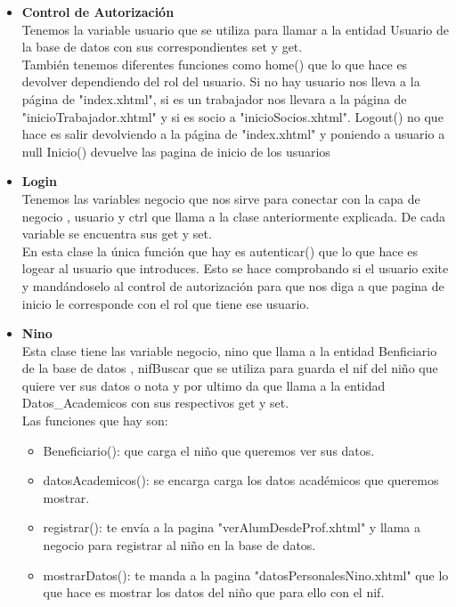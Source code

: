 \documentclass{article}
\begin{document}
\begin{itemize}
\item \textbf{Control de Autorización}\\
Tenemos la variable usuario que se utiliza para llamar a la entidad Usuario de la base de datos con sus correspondientes set y get.\\
También tenemos diferentes funciones como home() que lo que hace es devolver dependiendo del rol del usuario. Si no hay usuario nos lleva a la página de "index.xhtml", si es un trabajador nos llevara a la página de "inicioTrabajador.xhtml" y si es socio a "inicioSocios.xhtml". Logout() no que hace es salir devolviendo a la página de "index.xhtml" y poniendo a usuario a null Inicio() devuelve las pagina de inicio de los usuarios
 
\item \textbf{Login}\\
Tenemos las variables negocio que nos sirve para conectar con la capa de negocio , usuario y ctrl que llama a la clase anteriormente explicada. De cada variable se encuentra sus get y set.\\
En esta clase la única función que hay es autenticar() que lo que hace es logear al usuario que introduces. Esto se hace comprobando si el usuario exite y mandándoselo al control de autorización para que nos diga a que pagina de inicio le corresponde con el rol que tiene ese usuario.
 
\item \textbf{Nino}\\
Esta clase tiene las variable negocio, nino que llama a la entidad Benficiario de la base de datos , nifBuscar que se utiliza para guarda el nif del niño que quiere ver sus datos o nota y por ultimo da que llama a la entidad Datos_Academicos con sus respectivos get y set.\\ 
Las funciones que hay son:
\begin{itemize}
\item Beneficiario(): que carga el niño que queremos ver sus datos.
\item datosAcademicos(): se encarga carga los datos académicos que queremos mostrar.
\item registrar(): te envía a la pagina "verAlumDesdeProf.xhtml" y llama a negocio para registrar al niño en la base de datos.
\item mostrarDatos(): te manda a la pagina "datosPersonalesNino.xhtml" que lo que hace es mostrar los datos del niño que para ello con el nif.
\end{itemize}
 

\end{itemize}
\end{document}
